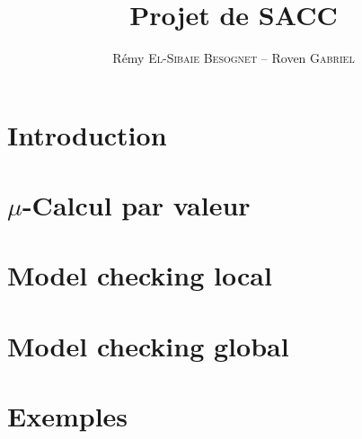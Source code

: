 \documentclass[a4paper]{article}
\title{Projet de SACC}
\author{Rémy \textsc{El-Sibaie Besognet} -- Roven \textsc{Gabriel}}
\begin{document}
\maketitle

\section{Introduction}

\section{$\mu$-Calcul par valeur}

\section{Model checking local}

\section{Model checking global}

\section{Exemples}
\end{document}
